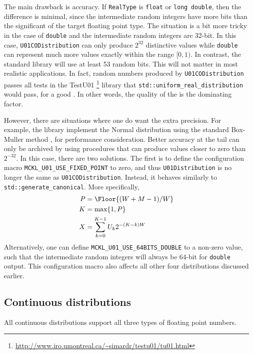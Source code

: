 The main drawback is accuracy. If \verb|RealType| is \verb|float| or
\verb|long double|, then the difference is minimal, since the intermediate
random integers have more bits than the significant of the target floating
point type. The situation is a bit more tricky in the case of \verb|double| and
the intermediate random integers are 32-bit. In this case,
\verb|U01CODistribution| can only produce $2^{32}$ distinctive values while
\verb|double| can represent much more values exactly within the range $[0, 1)$.
In contrast, the standard library will use at least 53 random bits. This will
not matter in most realistic applications. In fact, random numbers produced by
\verb|U01CODistribution| passes all tests in the {\lnfigures\tbfigures
  TestU01}%
\footnote{\url{http://www.iro.umontreal.ca/~simardr/testu01/tu01.html}} library
that \verb|std::uniform_real_distribution| would pass, for a good \rng. In
other words, the quality of the \rng is the dominating factor.

However, there are situations where one do want the extra precision. For
example, the library implement the Normal distribution using the standard
Box-Muller method \parencite{Box:1958hv}, for performance consideration. Better
accuracy at the tail can only be archived by using procedures that can produce
values closer to zero than $2^{-32}$. In this case, there are two solutions.
The first is to define the configuration macro
\verb|MCKL_U01_USE_FIXED_POINT| to zero, and thus \verb|U01Distribution| is no
longer the same as \verb|U01CODistribution|. Instead, it behaves similarly to
\verb|std::generate_canonical|. More specifically,
\begin{align*}
  P &= \Floor{(W + M - 1) / W} \\
  K &= \max\{1, P\} \\
  X &= \sum_{k=0}^{K - 1} U_k 2^{-(K - k)W}
\end{align*}
Alternatively, one can define \verb|MCKL_U01_USE_64BITS_DOUBLE| to a non-zero
value, such that the intermediate random integers will always be 64-bit for
\verb|double| output. This configuration macro also affects all other four
distributions discussed earlier.

\subsection{Continuous distributions}
\label{sub:Continuous distributions}

All continuous distributions support all three types of floating point numbers.

